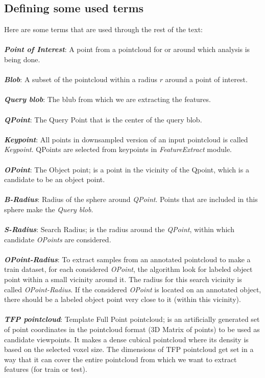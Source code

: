 \subsection{Defining some used terms}

Here are some terms that are used through the rest of the text:\\
\\
\textbf{\textit{Point of Interest}}: A point from a pointcloud for or around which analysis is being done.\\
\\
\textbf{\textit{Blob}}: A subset of the pointcloud within a radius $r$ around a point of interest.\\
\\
\textbf{\textit{Query blob}}: The blub from which we are extracting the features.\\
\\
\textbf{\textit{QPoint}}: The Query Point that is the center of the query blob.\\
\\
\textbf{\textit{Keypoint}}: All points in downsampled version of an input pointcloud is called {\it Keypoint}. QPoints are selected from keypoints in {\it FeatureExtract} module.\\
\\
\textbf{\textit{OPoint}}: The Object point; is a point in the vicinity of the Qpoint, which is a candidate to be an object point.\\
\\
\textbf{\textit{B-Radius}}: Radius of the sphere around {\it QPoint}. Points that are included in this sphere make the {\it Query blob}.\\
\\
\textbf{\textit{S-Radius}}: Search Radius; is the radius around the {\it QPoint}, within which candidate {\it OPoints} are considered.\\
\\
\textbf{\textit{OPoint-Radius}}: To extract samples from an annotated pointcloud to make a train dataset, for each considered {\it OPoint}, the algorithm look for labeled object point within a small vicinity around it. The radius for this search vicinity is called {\it OPoint-Radius}. If the considered {\it OPoint} is located on an annotated object, there should be a labeled object point very close to it (within this vicinity).\\ 
\\
\textbf{\textit{TFP pointcloud}}: Template Full Point pointcloud; is an artificially generated set of point coordinates in the pointcloud format (3D Matrix of points) to be used as candidate viewpoints. It makes a dense cubical pointcloud where its density is based on the selected voxel size. The dimensions of TFP pointcloud get set in a way that it can cover the entire pointcloud from which we want to extract features (for train or test).\\
